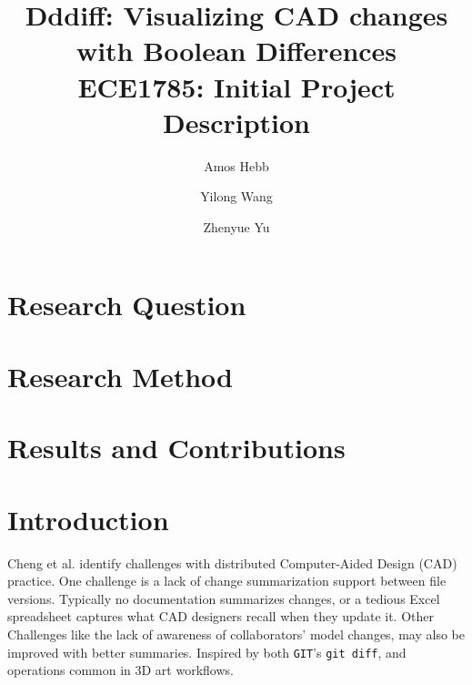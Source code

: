 \documentclass[sigconf,]{acmart}
\begin{document}
\title{Dddiff: Visualizing CAD changes with Boolean Differences\\
{\normalsize ECE1785: Initial Project Description}}

\author{Amos Hebb}
\author{Yilong Wang}
\author{Zhenyue Yu}
\makeatletter
\def\@ACM@checkaffil{%
    \if@ACM@instpresent\else
    \ClassWarningNoLine{\@classname}{No institution present for an affiliation}%
    \fi
    \if@ACM@citypresent\else
    \ClassWarningNoLine{\@classname}{No city present for an affiliation}%
    \fi
    \if@ACM@countrypresent\else
        \ClassWarningNoLine{\@classname}{No country present for an affiliation}%
    \fi
}
\makeatother
\maketitle





\section{Research Question}
\section{Research Method}
\section{Results and Contributions}
\section{Introduction}

Cheng et al.\cite{cheng2023age} identify challenges with distributed Computer-Aided Design (CAD) practice.
One challenge is a lack of change summarization support between file versions.
Typically no documentation summarizes changes, or a tedious Excel spreadsheet captures what CAD designers recall when they update it.
Other Challenges like the lack of awareness of collaborators' model changes, may also be improved with better summaries.
Inspired by both \texttt{GIT}'s \texttt{git diff}, and operations common in 3D art workflows.
\end{document}
